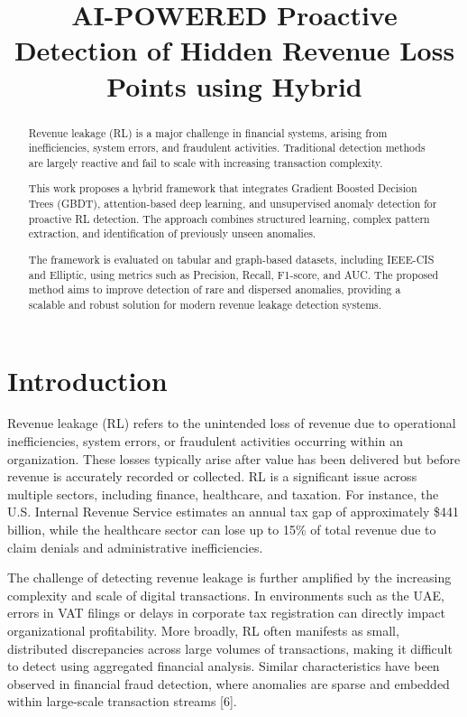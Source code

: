 \documentclass[conference]{IEEEtran}
\title{AI-POWERED Proactive Detection of Hidden Revenue Loss Points using Hybrid}
\author{
\IEEEauthorblockN{Shambhavi Jha, Venkata Shreya Vella}
\IEEEauthorblockA{Department of Computer Science \\
BITS Pilani, Dubai Campus \\
Email: f20230009@dubai.bits-pilani.ac.in, f20230096@dubai.bits-pilani.ac.in}
}
\begin{document}
\maketitle

\begin{abstract}

Revenue leakage (RL) is a major challenge in financial systems, arising from inefficiencies, system errors, and fraudulent activities. Traditional detection methods are largely reactive and fail to scale with increasing transaction complexity.

This work proposes a hybrid framework that integrates Gradient Boosted Decision Trees (GBDT), attention-based deep learning, and unsupervised anomaly detection for proactive RL detection. The approach combines structured learning, complex pattern extraction, and identification of previously unseen anomalies. 

The framework is evaluated on tabular and graph-based datasets, including IEEE-CIS and Elliptic, using metrics such as Precision, Recall, F1-score, and AUC. The proposed method aims to improve detection of rare and dispersed anomalies, providing a scalable and robust solution for modern revenue leakage detection systems.

\end{abstract}

\section{Introduction}

Revenue leakage (RL) refers to the unintended loss of revenue due to operational inefficiencies, system errors, or fraudulent activities occurring within an organization. These losses typically arise after value has been delivered but before revenue is accurately recorded or collected. RL is a significant issue across multiple sectors, including finance, healthcare, and taxation. For instance, the U.S. Internal Revenue Service estimates an annual tax gap of approximately \$441 billion, while the healthcare sector can lose up to 15\% of total revenue due to claim denials and administrative inefficiencies.

The challenge of detecting revenue leakage is further amplified by the increasing complexity and scale of digital transactions. In environments such as the UAE, errors in VAT filings or delays in corporate tax registration can directly impact organizational profitability. More broadly, RL often manifests as small, distributed discrepancies across large volumes of transactions, making it difficult to detect using aggregated financial analysis. Similar characteristics have been observed in financial fraud detection, where anomalies are sparse and embedded within large-scale transaction streams [6].
\end{document}
